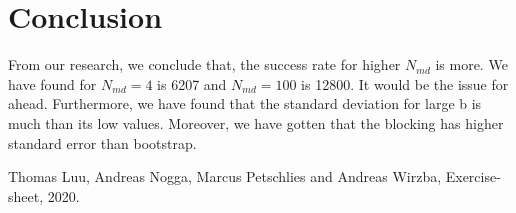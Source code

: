 \documentclass[11pt, a4paper, DIV=12]{scrartcl}
\begin{document}
\section{Conclusion}
From our research, we conclude that, the success rate for higher $ N_{md} $ is more. We have found for $ N_{md}=4$ is 6207 and $ N_{md}=100 $ is 12800. It would be the issue for ahead. Furthermore, we have found that the standard deviation for large b is much than its low values. Moreover, we have gotten that the blocking has higher standard error than bootstrap.
	
\begin{thebibliography}{12}
Thomas Luu, Andreas Nogga, Marcus Petschlies and  Andreas Wirzba, Exercise-sheet, 2020. 
\end{thebibliography}	
\end{document}
